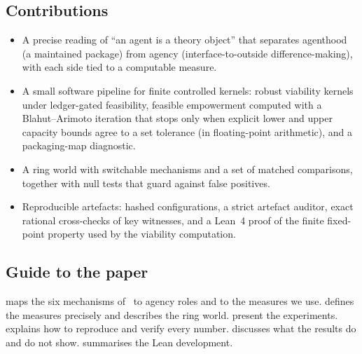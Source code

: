 \subsection{Contributions}
\begin{itemize}[leftmargin=*, itemsep=0.25em]
  \item A precise reading of ``an agent is a theory object'' that separates agenthood (a maintained package) from agency (interface-to-outside difference-making), with each side tied to a computable measure.
  \item A small software pipeline for finite controlled kernels: robust viability kernels under ledger-gated feasibility, feasible empowerment computed with a Blahut--Arimoto iteration that stops only when explicit lower and upper capacity bounds agree to a set tolerance (in floating-point arithmetic), and a packaging-map diagnostic.
  \item A ring world with switchable mechanisms and a set of matched comparisons, together with null tests that guard against false positives.
  \item Reproducible artefacts: hashed configurations, a strict artefact auditor, exact rational cross-checks of key witnesses, and a Lean~4 proof of the finite fixed-point property used by the viability computation.
\end{itemize}

\subsection{Guide to the paper}
 maps the six mechanisms of \SBT\ to agency roles and to the measures we use.  defines the measures precisely and describes the ring world.  present the experiments.  explains how to reproduce and verify every number.  discusses what the results do and do not show.  summarises the Lean development.

